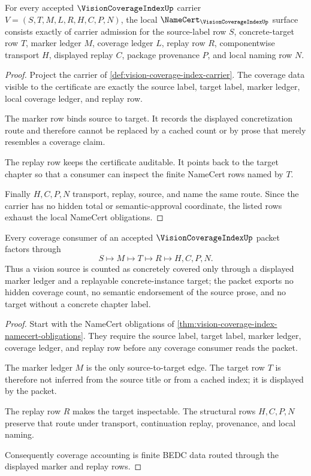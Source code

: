 \begin{theorem}
\label{thm:vision-coverage-index-namecert-obligations}
For every accepted $\VisionCoverageIndexUp$ carrier $V=(S,T,M,L,R,H,C,P,N)$, the local $\NameCert_{\VisionCoverageIndexUp}$ surface consists exactly of carrier admission for the source-label row $S$, concrete-target row $T$, marker ledger $M$, coverage ledger $L$, replay row $R$, componentwise transport $H$, displayed replay $C$, package provenance $P$, and local naming row $N$.
\end{theorem}
\begin{proof}
Project the carrier of \autoref{def:vision-coverage-index-carrier}. The coverage data visible to the certificate are exactly the source label, target label, marker ledger, local coverage ledger, and replay row.

The marker row binds source to target. It records the displayed concretization route and therefore cannot be replaced by a cached count or by prose that merely resembles a coverage claim.

The replay row keeps the certificate auditable. It points back to the target chapter so that a consumer can inspect the finite NameCert rows named by $T$.

Finally $H,C,P,N$ transport, replay, source, and name the same route. Since the carrier has no hidden total or semantic-approval coordinate, the listed rows exhaust the local NameCert obligations.
\end{proof}

\begin{theorem}
\label{thm:vision-coverage-index-replay-handoff}
Every coverage consumer of an accepted $\VisionCoverageIndexUp$ packet factors through
$$
S \longmapsto M \longmapsto T \longmapsto R \longmapsto H,C,P,N .
$$
Thus a vision source is counted as concretely covered only through a displayed marker ledger and a replayable concrete-instance target; the packet exports no hidden coverage count, no semantic endorsement of the source prose, and no target without a concrete chapter label.
\end{theorem}
\begin{proof}
Start with the NameCert obligations of \autoref{thm:vision-coverage-index-namecert-obligations}. They require the source label, target label, marker ledger, coverage ledger, and replay row before any coverage consumer reads the packet.

The marker ledger $M$ is the only source-to-target edge. The target row $T$ is therefore not inferred from the source title or from a cached index; it is displayed by the packet.

The replay row $R$ makes the target inspectable. The structural rows $H,C,P,N$ preserve that route under transport, continuation replay, provenance, and local naming.

Consequently coverage accounting is finite BEDC data routed through the displayed marker and replay rows.
\end{proof}

